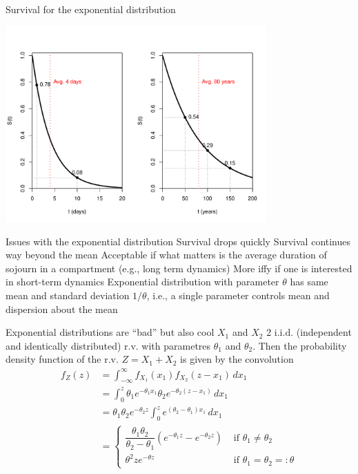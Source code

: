 \documentclass[aspectratio=169]{beamer}\usepackage[]{graphicx}\usepackage[]{xcolor}
\begin{document}
\begin{frame}{Survival for the exponential distribution}
\begin{center}
\includegraphics[width=0.75\textwidth]{FIGS/L23-prop_surviving_exp_80years_details-1.pdf}
\end{center}
\end{frame}

\begin{frame}{Issues with the exponential distribution}
\bbullet Survival drops quickly
\vfill
\bbullet Survival continues way beyond the mean
\vfill
Acceptable if what matters is the average duration of sojourn in a compartment (e.g., long term dynamics)
\vfill
More iffy if one is interested in short-term dynamics
\vfill
\bbullet Exponential distribution with parameter $\theta$ has same mean and standard deviation $1/\theta$, i.e., a single parameter controls mean and dispersion about the mean
\end{frame}

\begin{frame}{Exponential distributions are ``bad'' but also cool}
$X_1$ and $X_2$ 2 i.i.d. (independent and identically distributed) r.v. with parametres $\theta_1$ and $\theta_2$. Then the probability density function of the r.v. $Z=X_1+X_2$ is given by the convolution
\begin{align}
 f_Z(z) &= \int_{-\infty}^\infty f_{X_1}(x_1) f_{X_2}(z - x_1)\,dx_1 \nonumber\\
   &= \int_0^z \theta_1 e^{-\theta_1 x_1} \theta_2 e^{-\theta_2(z - x_1)} \, dx_1 \nonumber\\
   &= \theta_1 \theta_2 e^{-\theta_2 z} \int_0^z e^{(\theta_2 - \theta_1)x_1}\,dx_1 \nonumber\\
   &= \begin{cases}
        \dfrac{\theta_1 \theta_2}{\theta_2-\theta_1} \left(e^{-\theta_1 z} - e^{-\theta_2 z}\right) & \text{ if } \theta_1 \neq \theta_2 \\
        \theta^2 z e^{-\theta z} & \text{ if } \theta_1 = \theta_2 =: \theta
      \end{cases}
\end{align}
\end{frame}
\end{document}
